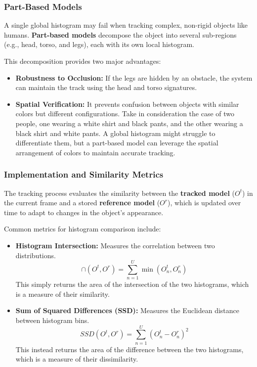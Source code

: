 \subsubsection{Part-Based Models}
A single global histogram may fail when tracking complex, non-rigid objects like humans. 
\textbf{Part-based models} decompose the object into several sub-regions (e.g., head, torso, and legs), 
each with its own local histogram.

This decomposition provides two major advantages:
\begin{itemize}
    \item \textbf{Robustness to Occlusion:} If the legs are hidden by an obstacle, 
    the system can maintain the track using the head and torso signatures.
    \item \textbf{Spatial Verification:} It prevents confusion between objects with similar colors but different 
    configurations. Take in consideration the case of two people, one wearing a white shirt and black pants, 
    and the other wearing a black shirt and white pants. A global histogram might struggle to differentiate them, 
    but a part-based model can leverage the spatial arrangement of colors to maintain accurate tracking.
\end{itemize}

\subsubsection{Implementation and Similarity Metrics}
The tracking process evaluates the similarity between the \textbf{tracked model} ($O^t$) 
in the current frame and a stored \textbf{reference model} ($O^r$), which is updated over time to adapt to changes in the object's appearance.

Common metrics for histogram comparison include:
\begin{itemize}
    \item \textbf{Histogram Intersection:} Measures the correlation between two distributions.
    $$\cap (O^t, O^r) = \sum_{n=1}^{U} \min(O^t_{n}, O^r_{n})$$
    This simply returns the area of the intersection of the two histograms, which is a measure of their similarity.
    \item \textbf{Sum of Squared Differences (SSD):} Measures the Euclidean distance between histogram bins.
    $$SSD(O^t, O^r) = \sum_{n=1}^{U} (O^t_{n} - O^r_{n})^2$$
    This instead returns the area of the difference between the two histograms, which is a measure of their dissimilarity.
\end{itemize}

